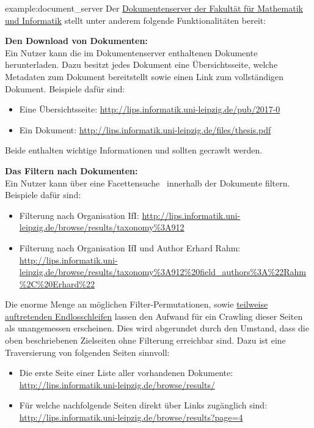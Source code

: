 \begin{example}{example:document_server}
	Der \href{http://lips.informatik.uni-leipzig.de/}{Dokumentenserver der Fakultät für Mathematik und Informatik}
	stellt unter anderem folgende Funktionalitäten bereit:

	\textbf{Den Download von Dokumenten:}\\
	Ein Nutzer kann die im Dokumentenserver enthaltenen Dokumente herunterladen.
	Dazu besitzt jedes Dokument eine Übersichtsseite, welche Metadaten zum Dokument bereitstellt sowie
	einen Link zum vollständigen Dokument.
	Beispiele dafür sind:
	\begin{itemize}
		\item Eine Übersichtsseite: \url{http://lips.informatik.uni-leipzig.de/pub/2017-0}
		\item Ein Dokument: \url{http://lips.informatik.uni-leipzig.de/files/thesis.pdf}
	\end{itemize}
	Beide enthalten wichtige Informationen und sollten gecrawlt werden.

	\textbf{Das Filtern nach Dokumenten:}\\
	Ein Nutzer kann über eine Facettensuche~\cite{wiki.facetted_search} innerhalb der Dokumente filtern.
	Beispiele dafür sind:
	\begin{itemize}
		\item Filterung nach \glqq Organisation IfI\grqq: \url{http://lips.informatik.uni-leipzig.de/browse/results/taxonomy%3A912}
		\item Filterung nach \glqq Organisation IfI und Author Erhard Rahm\grqq:\\ \url{http://lips.informatik.uni-leipzig.de/browse/results/taxonomy%3A912%20field_authors%3A%22Rahm%2C%20Erhard%22}
	\end{itemize}
	Die enorme Menge an möglichen Filter-Permutationen,
	sowie \href{http://se-pubs.dbs.uni-leipzig.de/pubs/results/0%200%200%200%20taxonomy%3A30%2C696}
		{teilweise auftretenden Endlosschleifen} lassen den Aufwand für ein Crawling dieser Seiten als unangemessen erscheinen.
	Dies wird abgerundet durch den Umstand, dass die oben beschriebenen Zielseiten ohne Filterung erreichbar sind.
	Dazu ist eine Traversierung von folgenden Seiten sinnvoll:
	\begin{itemize}
		\item Die erste Seite einer Liste aller vorhandenen Dokumente: \url{http://lips.informatik.uni-leipzig.de/browse/results/}
		\item Für welche nachfolgende Seiten direkt über Links zugänglich sind:
		\url{http://lips.informatik.uni-leipzig.de/browse/results?page=4}
	\end{itemize}
\end{example}
